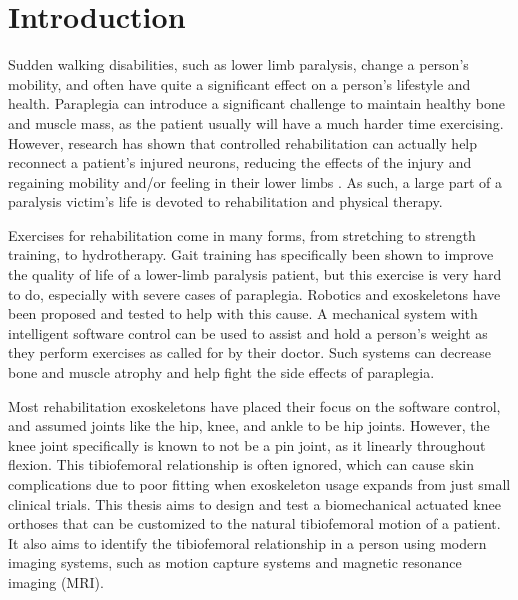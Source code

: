 \chapter{Introduction}
Sudden walking disabilities, such as lower limb paralysis, change a person's mobility, and often have quite a significant effect on a person's lifestyle and health. Paraplegia can introduce a significant challenge to maintain healthy bone and muscle mass, as the patient usually will have a much harder time exercising. However, research has shown that controlled rehabilitation can actually help reconnect a patient's injured neurons, reducing the effects of the injury and regaining mobility and/or feeling in their lower limbs \cite{GaitTrainingClinical}. As such, a large part of a paralysis victim's life is devoted to rehabilitation and physical therapy.

Exercises for rehabilitation come in many forms, from stretching to strength training, to hydrotherapy. Gait training has specifically been shown to improve the quality of life of a lower-limb paralysis patient, but this exercise is very hard to do, especially with severe cases of paraplegia. Robotics and exoskeletons have been proposed and tested to help with this cause. A mechanical system with intelligent software control can be used to assist and hold a person's weight as they perform exercises as called for by their doctor. Such systems can decrease bone and muscle atrophy and help fight the side effects of paraplegia. 

Most rehabilitation exoskeletons have placed their focus on the software control, and assumed joints like the hip, knee, and ankle to be hip joints. However, the knee joint specifically is known to not be a pin joint, as it linearly throughout flexion. This tibiofemoral relationship is often ignored, which can cause skin complications due to poor fitting when exoskeleton usage expands from just small clinical trials. This thesis aims to design and test a biomechanical actuated knee orthoses that can be customized to the natural tibiofemoral motion of a patient. It also aims to identify the tibiofemoral relationship in a person using modern imaging systems, such as motion capture systems and magnetic resonance imaging (MRI).